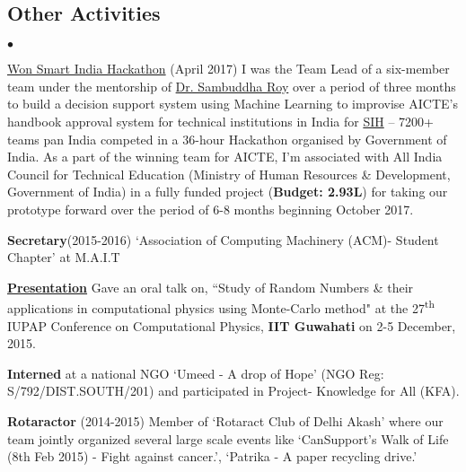 \documentclass[margin,line]{res}
\newenvironment{list2}{
  \begin{list}{$\bullet$}{%
      \setlength{\itemsep}{0in}
      \setlength{\parsep}{0in} \setlength{\parskip}{0in}
      \setlength{\topsep}{0in} \setlength{\partopsep}{0in}
      \setlength{\leftmargin}{0.2in}}}{\end{list}}
\begin{document}
\begin{resume}
\section{\sc Other Activities}
\begin{list2}
\item {\href{https://www.linkedin.com/feed/update/urn:li:activity:6255398180318470144}{\color{blue} Won Smart India Hackathon}} (April 2017) I was the Team Lead of a six-member team under the mentorship of {\href{https://www.linkedin.com/in/sambuddharoy/}{\color{blue} Dr. Sambuddha Roy}} over a period of three months to build a decision support system using Machine Learning to improvise AICTE's handbook approval system for technical institutions in India for {\href{https://www.linkedin.com/pulse/smart-india-hackathon-2017-anirban-sarker}{\color{blue} SIH}} -- 7200+ teams pan India competed in a 36-hour Hackathon organised by Government of India. As a part of the winning team for AICTE, I'm associated with All India Council for Technical Education (Ministry of Human Resources \& Development, Government of India) in a fully funded project ({\bf Budget: 2.93L}) for taking our prototype forward over the period of 6-8 months beginning October 2017. 
\item {\bf Secretary}(2015-2016)  `Association of Computing Machinery (ACM)- Student Chapter' at M.A.I.T
\item {\bf {\href{https://drive.google.com/open?id=0B8hsJozmBILEcGRiT2VzZ0hFUEE}{\color{blue} Presentation}}} Gave an oral talk on, ``Study of Random Numbers \& their applications in computational physics using Monte-Carlo method" at the 27\textsuperscript{th} IUPAP Conference on Computational Physics, {\bf IIT Guwahati} on 2-5 December, 2015.
\item {\bf Interned} at a national NGO `Umeed - A drop of Hope' (NGO Reg: S/792/DIST.SOUTH/201) and participated in Project- Knowledge for All (KFA).
\item {\bf Rotaractor} (2014-2015) Member of `Rotaract Club of Delhi Akash' where our team jointly organized several large scale events like `CanSupport's Walk of Life (8th Feb 2015) - Fight against cancer.', 
`Patrika - A paper recycling drive.'
\end{list2}
\end{resume}
\end{document}
